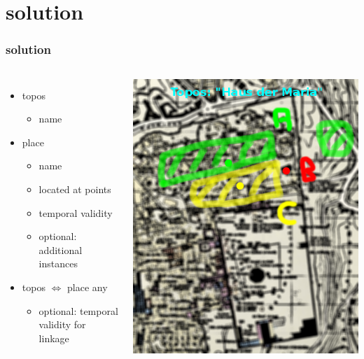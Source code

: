 \documentclass{beamer}
\begin{document}
\section{solution} 
\begin{frame}
			\frametitle{solution}
			\begin{columns}
			\begin{itemize}
				\item topos
					\begin{itemize}
						\item name
					\end{itemize} 
					\item place
					\begin{itemize}
						\item name
						\item located at points
						\item temporal validity 												
						\item optional: additional instances
					\end{itemize}
					\item topos $\Leftrightarrow$ place any
					\begin{itemize}
						\item optional: temporal validity for linkage
					\end{itemize}
			\end{itemize}
					\includegraphics[width=\linewidth]{detail_1}
			\end{columns}
	\end{frame}
\end{document}
